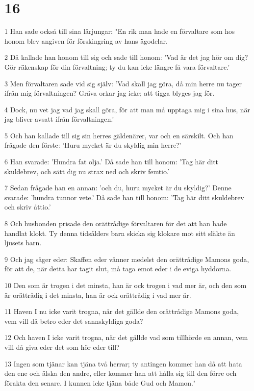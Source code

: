 \chapter{16}

\par 1 Han sade också till sina lärjungar: "En rik man hade en förvaltare som hos honom blev angiven för förskingring av hans ägodelar.
\par 2 Då kallade han honom till sig och sade till honom: 'Vad är det jag hör om dig? Gör räkenskap för din förvaltning; ty du kan icke längre få vara förvaltare.'
\par 3 Men förvaltaren sade vid sig själv: 'Vad skall jag göra, då min herre nu tager ifrån mig förvaltningen? Gräva orkar jag icke; att tigga blyges jag för.
\par 4 Dock, nu vet jag vad jag skall göra, för att man må upptaga mig i sina hus, när jag bliver avsatt ifrån förvaltningen.'
\par 5 Och han kallade till sig sin herres gäldenärer, var och en särskilt. Och han frågade den förste: 'Huru mycket är du skyldig min herre?'
\par 6 Han svarade: 'Hundra fat olja.' Då sade han till honom: 'Tag här ditt skuldebrev, och sätt dig nu strax ned och skriv femtio.'
\par 7 Sedan frågade han en annan: 'och du, huru mycket är du skyldig?' Denne svarade: 'hundra tunnor vete.' Då sade han till honom: 'Tag här ditt skuldebrev och skriv åttio.'
\par 8 Och husbonden prisade den orättrådige förvaltaren för det att han hade handlat klokt. Ty denna tidsålders barn skicka sig klokare mot sitt släkte än ljusets barn.
\par 9 Och jag säger eder: Skaffen eder vänner medelst den orättrådige Mamons goda, för att de, när detta har tagit slut, må taga emot eder i de eviga hyddorna.
\par 10 Den som är trogen i det minsta, han är ock trogen i vad mer är, och den som är orättrådig i det minsta, han är ock orättrådig i vad mer är.
\par 11 Haven I nu icke varit trogna, när det gällde den orättrådige Mamons goda, vem vill då betro eder det sannskyldiga goda?
\par 12 Och haven I icke varit trogna, när det gällde vad som tillhörde en annan, vem vill då giva eder det som hör eder till?
\par 13 Ingen som tjänar kan tjäna två herrar; ty antingen kommer han då att hata den ene och älska den andre, eller kommer han att hålla sig till den förre och förakta den senare. I kunnen icke tjäna både Gud och Mamon."
